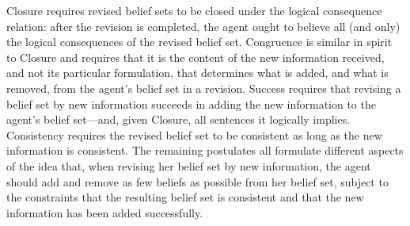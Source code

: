 Closure requires revised belief sets to be closed under the logical consequence relation: after the revision is completed, the agent ought to believe all (and only) the logical consequences of the revised belief set. Congruence is similar in spirit to Closure and requires that it is the content of the new information received, and not its particular formulation, that determines what is added, and what is removed, from the agent's belief set in a revision. Success requires that revising a belief set by new information succeeds in adding the new information to the agent's belief set---and, given Closure, all sentences it logically implies. Consistency requires the revised belief set to be consistent as long as the new information is consistent. The remaining postulates all formulate different aspects of the idea that, when revising her belief set by new information, the agent should add and remove as few beliefs as possible from her belief set, subject to the constraints that the resulting belief set is consistent and that the new information has been added successfully.

